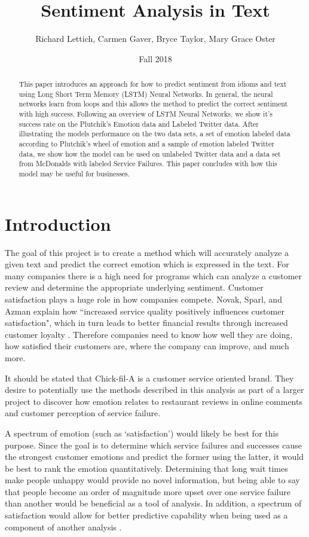 \documentclass[titlepage,letterpaper]{article}
\title{Sentiment Analysis in Text}
\author{Richard Lettich, Carmen Gaver, Bryce Taylor, Mary Grace Oster}
\date{Fall 2018}
\begin{document}
\maketitle

\tableofcontents

\begin{abstract}
This paper introduces an approach for how to predict sentiment from idioms and text using Long Short Term Memory (LSTM) Neural Networks. In general, the neural networks learn from loops and this allows the method to predict the correct sentiment with high success. Following an overview of LSTM Neural Networks, we show it's success rate on the Plutchik's Emotion data and Labeled Twitter data. After illustrating the models performance on the two data sets, a set of emotion labeled data according to Plutchik's wheel of emotion and a sample of emotion labeled Twitter data, we show how the model can be used on unlabeled Twitter data and a data set from McDonalds with labeled Service Failures. This paper concludes with how this model may be useful for businesses.\\
\end{abstract}

\section{Introduction}

The goal of this project is to create a method which will accurately analyze a given text and predict the correct emotion which is expressed in the text. For many companies there is a high need for programs which can analyze a customer review and determine the appropriate underlying sentiment. Customer satisfaction plays a huge role in how companies compete. Novak, Sparl, and Azman explain how ``increased service quality positively influences customer satisfaction", which in turn leads to better financial results through increased customer loyalty \cite{BusinessCustomerSatisfaction}. Therefore companies need to know how well they are doing, how satisfied their customers are, where the company can improve, and much more.

It should be stated that Chick-fil-A is a customer service oriented brand. They desire to potentially use the methods described in this analysis as part of a larger project to discover how emotion relates to restaurant reviews in online comments and customer perception of service failure.

A spectrum of emotion (such as `satisfaction') would likely be best for this purpose. Since the goal is to determine which service failures and successes cause the strongest customer emotions and predict the former using the latter, it would be best to rank the emotion quantitatively. Determining that long wait times make people unhappy would provide no novel information, but being able to say that people become an order of magnitude more upset over one service failure than another would be beneficial as a tool of analysis. In addition, a spectrum of satisfaction would allow for better predictive capability when being used as a component of another analysis \cite{lowriwilliams}.
\end{document}
